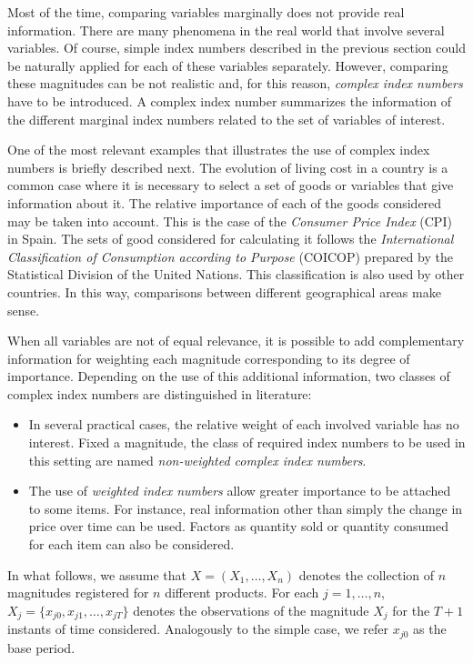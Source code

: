 Most of the time, comparing variables marginally does not provide real information. There are many phenomena in the real world that involve several variables. Of course, simple index numbers described in the previous section could be naturally applied for each of these variables separately. However, comparing these magnitudes can be not realistic and, for this reason, \emph{complex index numbers} have to be introduced. A complex index number summarizes the information of the different marginal index numbers related to the set of variables of interest. 

One of the most relevant examples that illustrates the use of complex index numbers is briefly  described next. The evolution  of living cost in a country is a common case where it is necessary to select a set of goods or variables that give information about it. The relative importance of each of the goods considered may be taken into account. This is the case of the \emph{Consumer Price Index} (CPI) in Spain. The sets of good considered for calculating it follows the \emph{International Classification of Consumption according to Purpose} (COICOP) prepared by the Statistical Division of the United Nations. This classification is also used by other countries. In this way, comparisons between different geographical areas make sense. 

When all variables are not of equal relevance, it is possible to add complementary information for weighting each magnitude corresponding to its degree of importance. Depending on the use of this additional information,  two classes of complex index numbers are distinguished in literature:

\begin{itemize}
	\item In several practical cases, the relative weight of each involved variable has no interest. Fixed a magnitude, the class of required index numbers to be used in this setting are named \emph{non-weighted complex index numbers}. 
\item The use of \emph{weighted index numbers} allow greater importance to be attached to some items. For instance, real information other than simply the change in price over time can be used. Factors as quantity sold or quantity consumed for each item can also be  considered.
\end{itemize}

In what follows, we assume that $X=(X_1,\dots,X_n)$ denotes the collection of $n$ magnitudes registered for $n$ different products. For each $j=1,\dots,n$, $X_j=\{x_{j0},x_{j1},\dots,x_{jT}\}$ denotes the observations of the magnitude $X_j$ for the  $T+1$ instants of time considered. Analogously to the simple case, we refer $x_{j0}$ as the base period.

